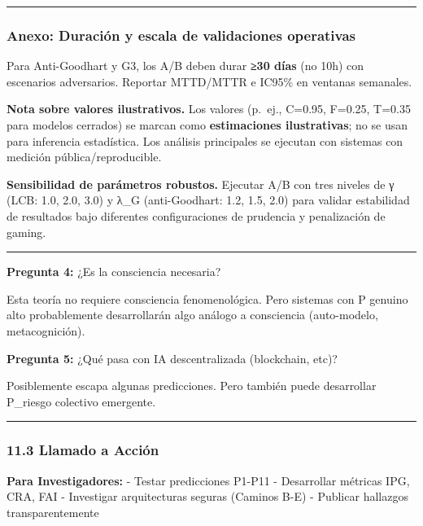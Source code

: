 \begin{center}\rule{0.5\linewidth}{0.5pt}\end{center}

\subsubsection{Anexo: Duración y escala de validaciones
operativas}\label{anexo-duraciuxf3n-y-escala-de-validaciones-operativas}

Para Anti-Goodhart y G3, los A/B deben durar \textbf{≥30 días} (no 10h)
con escenarios adversarios. Reportar MTTD/MTTR e IC95\% en ventanas
semanales.

\textbf{Nota sobre valores ilustrativos.} Los valores (p.~ej., C=0.95,
F=0.25, T=0.35 para modelos cerrados) se marcan como
\textbf{estimaciones ilustrativas}; no se usan para inferencia
estadística. Los análisis principales se ejecutan con sistemas con
medición pública/reproducible.

\textbf{Sensibilidad de parámetros robustos.} Ejecutar A/B con tres
niveles de γ (LCB: 1.0, 2.0, 3.0) y λ\_G (anti-Goodhart: 1.2, 1.5, 2.0)
para validar estabilidad de resultados bajo diferentes configuraciones
de prudencia y penalización de gaming.

\begin{center}\rule{0.5\linewidth}{0.5pt}\end{center}

\textbf{Pregunta 4:} ¿Es la consciencia necesaria?

Esta teoría no requiere consciencia fenomenológica. Pero sistemas con P
genuino alto probablemente desarrollarán algo análogo a consciencia
(auto-modelo, metacognición).

\textbf{Pregunta 5:} ¿Qué pasa con IA descentralizada (blockchain, etc)?

Posiblemente escapa algunas predicciones. Pero también puede desarrollar
P\_riesgo colectivo emergente.

\begin{center}\rule{0.5\linewidth}{0.5pt}\end{center}

\subsubsection{11.3 Llamado a Acción}\label{llamado-a-acciuxf3n}

\textbf{Para Investigadores:} - Testar predicciones P1-P11 - Desarrollar
métricas IPG, CRA, FAI - Investigar arquitecturas seguras (Caminos B-E)
- Publicar hallazgos transparentemente

